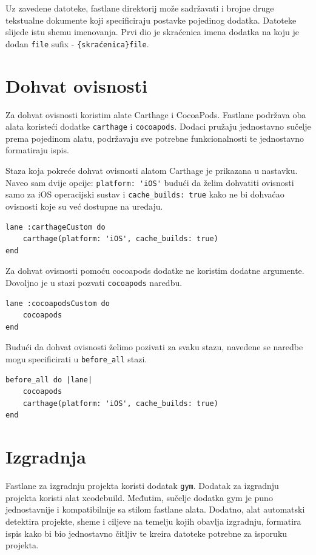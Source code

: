 \documentclass[times, utf8, diplomski, numeric]{fer}
\begin{document}
\begin{appendices}
Uz zavedene datoteke, fastlane direktorij može sadržavati i brojne druge tekstualne dokumente koji specificiraju postavke pojedinog dodatka. Datoteke slijede istu shemu imenovanja. Prvi dio je skraćenica imena dodatka na koju je dodan \verb|file| sufix - \verb|{skraćenica}file|.

\section{Dohvat ovisnosti}

Za dohvat ovisnosti koristim alate Carthage i CocoaPods. Fastlane podržava oba alata koristeći dodatke \verb|carthage| i \verb|cocoapods|. Dodaci pružaju jednostavno sučelje prema pojedinom alatu, podržavaju sve potrebne funkcionalnosti te jednostavno formatiraju ispis.

Staza koja pokreće dohvat ovisnosti alatom Carthage je prikazana u nastavku. Naveo sam dvije opcije: \verb|platform: 'iOS'| budući da želim dohvatiti ovisnosti samo za iOS operacijski sustav i \verb|cache_builds: true| kako ne bi dohvaćao ovisnosti koje su već dostupne na uređaju.

\begin{verbatim}
lane :carthageCustom do
    carthage(platform: 'iOS', cache_builds: true)
end
\end{verbatim}

Za dohvat ovisnosti pomoću cocoapods dodatke ne koristim dodatne argumente. Dovoljno je u stazi pozvati \verb|cocoapods| naredbu.

\begin{verbatim}
lane :cocoapodsCustom do
    cocoapods
end
\end{verbatim}

Budući da dohvat ovisnosti želimo pozivati za svaku stazu, navedene se naredbe mogu specificirati u \verb|before_all| stazi.

\begin{verbatim}
before_all do |lane|
    cocoapods
    carthage(platform: 'iOS', cache_builds: true)
end
\end{verbatim}

\section{Izgradnja}

Fastlane za izgradnju projekta koristi dodatak \verb|gym|\citep{fastlane:gym}. Dodatak za izgradnju projekta koristi alat xcodebuild. Međutim, sučelje dodatka gym je puno jednostavnije i kompatibilnije sa stilom fastlane alata. Dodatno, alat automatski detektira projekte, sheme i ciljeve na temelju kojih obavlja izgradnju, formatira ispis kako bi bio jednostavno čitljiv te kreira datoteke potrebne za isporuku projekta.


\end{appendices}
\end{document}
